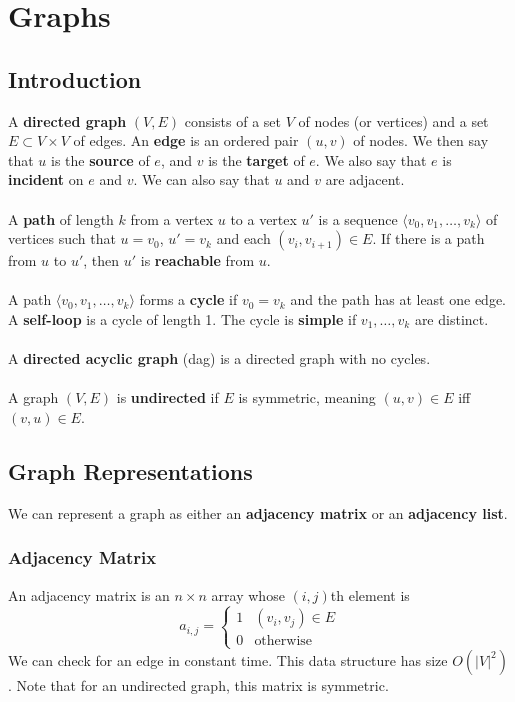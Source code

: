 \documentclass{article}
\begin{document}
\section{Graphs}
    \subsection{Introduction}
        A \textbf{directed graph} $(V, E)$ consists of a set $V$ of nodes (or vertices) and a set $E \subset V \times V$ of edges. An \textbf{edge} is an ordered pair $(u, v)$ of nodes. We then say that $u$ is the \textbf{source} of $e$, and $v$ is the \textbf{target} of $e$. We also say that $e$ is \textbf{incident} on $e$ and $v$. We can also say that $u$ and $v$ are adjacent. \\ \\
        A \textbf{path} of length $k$ from a vertex $u$ to a vertex $u'$ is a sequence $\langle v_0, v_1, \dots, v_k \rangle$ of vertices such that $u = v_0$, $u' = v_k$ and each $(v_i,v_{i+1}) \in E$. If there is a path from $u$ to $u'$, then $u'$ is \textbf{reachable} from $u$. \\ \\
        A path $\langle v_0, v_1, \dots, v_k \rangle$ forms a \textbf{cycle} if $v_0 = v_k$ and the path has at least one edge. A \textbf{self-loop} is a cycle of length 1. The cycle is \textbf{simple} if $v_1, \dots, v_k$ are distinct.\\ \\
        A \textbf{directed acyclic graph} (dag) is a directed graph with no cycles. \\ \\
        A graph $(V, E)$ is \textbf{undirected} if $E$ is symmetric, meaning $(u,v) \in E$ iff $(v, u) \in E$.
    \subsection{Graph Representations}
        We can represent a graph as either an \textbf{adjacency matrix} or an \textbf{adjacency list}.
        \subsubsection{Adjacency Matrix}
            An adjacency matrix is an $n \times n$ array whose $(i,j)$th element is 
            \[ 
                a_{i,j} = 
                \begin{cases} 
                    1 & (v_i,v_j) \in E\\
                    0 & \text{otherwise}
                \end{cases}
            \]
            We can check for an edge in constant time. This data structure has size $O(|V|^2)$. Note that for an undirected graph, this matrix is symmetric.
\end{document}
